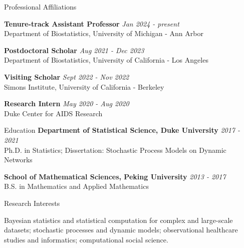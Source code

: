 \documentclass{resume} %
\begin{document}

\begin{rSection}{Professional Affiliations}
	
{\bf Tenure-track Assistant Professor} \hfill {\em Jan 2024  -  present} 
\\ {\small Department of Biostatistics, University of Michigan - Ann Arbor}
	
{\bf Postdoctoral Scholar} \hfill {\em Aug 2021 - Dec 2023} 
\\ {\small Department of Biostatistics, University of California - Los Angeles}

{\bf Visiting Scholar} \hfill {\em Sept 2022 - Nov 2022} 
\\ {\small Simons Institute, University of California - Berkeley}


{\bf Research Intern} \hfill {\em May 2020 - Aug 2020} 
\\ { \small Duke Center for AIDS Research}
\end{rSection}

\begin{rSection}{Education}
{\bf Department of Statistical Science, Duke University} \hfill {\em 2017 - 2021} 
\\ Ph.D. in Statistics; Dissertation: Stochastic Process Models on Dynamic Networks

{\bf School of Mathematical Sciences, Peking University} \hfill {\em 2013 - 2017} 
\\ B.S. in Mathematics and Applied Mathematics
\end{rSection}

\begin{rSection}{Research Interests}

Bayesian statistics and statistical computation for complex and large-scale datasets; stochastic processes and dynamic models; observational healthcare studies and 
informatics; computational social science. %

\end{rSection}



\end{document}
